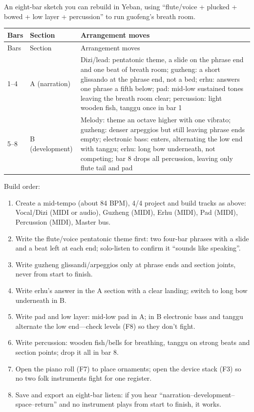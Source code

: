 An eight-bar sketch you can rebuild in Yeban, using ``flute/voice + plucked + bowed + low layer + percussion'' to run guofeng's breath room.

\begin{longtable}{p{}p{}p{}}
\toprule
Bars & Section & Arrangement moves \\
\midrule
\endfirsthead
\toprule
Bars & Section & Arrangement moves \\
\midrule
\endhead
1--4 & A (narration) & Dizi/lead: pentatonic theme, a slide on the phrase end and one beat of breath room; guzheng: a short glissando at the phrase end, not a bed; erhu: answers one phrase a fifth below; pad: mid-low sustained tones leaving the breath room clear; percussion: light wooden fish, tanggu once in bar 1 \\
5--8 & B (development) & Melody: theme an octave higher with one vibrato; guzheng: denser arpeggios but still leaving phrase ends empty; electronic bass: enters, alternating the low end with tanggu; erhu: long bow underneath, not competing; bar 8 drops all percussion, leaving only flute tail and pad \\
\bottomrule
\end{longtable}

Build order:

\begin{sloppypar}
\begin{enumerate}
\item Create a mid-tempo (about 84 BPM), 4/4 project and build tracks as above: Vocal/Dizi (MIDI or audio), Guzheng (MIDI), Erhu (MIDI), Pad (MIDI), Percussion (MIDI), Master bus.
\item Write the flute/voice pentatonic theme first: two four-bar phrases with a slide and a beat left at each end; solo-listen to confirm it ``sounds like speaking''.
\item Write guzheng glissandi/arpeggios only at phrase ends and section joints, never from start to finish.
\item Write erhu's answer in the A section with a clear landing; switch to long bow underneath in B.
\item Write pad and low layer: mid-low pad in A; in B electronic bass and tanggu alternate the low end---check levels (F8) so they don't fight.
\item Write percussion: wooden fish/bells for breathing, tanggu on strong beats and section points; drop it all in bar 8.
\item Open the piano roll (F7) to place ornaments; open the device stack (F3) so no two folk instruments fight for one register.
\item Save and export an eight-bar listen: if you hear ``narration--development--space--return'' and no instrument plays from start to finish, it works.
\end{enumerate}
\end{sloppypar}

